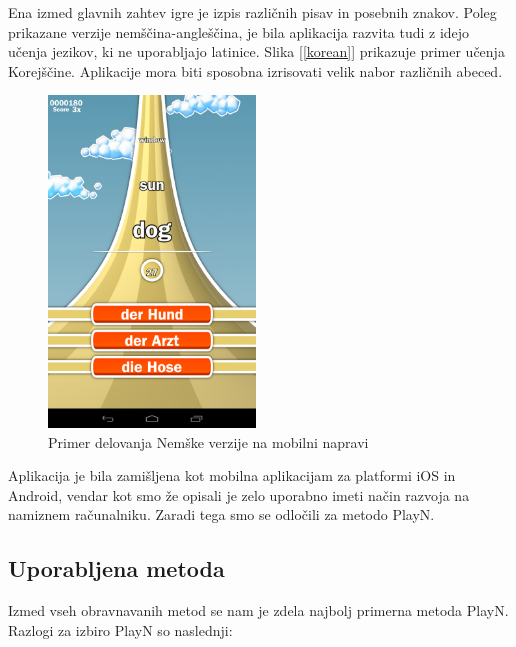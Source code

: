 Ena izmed glavnih zahtev igre je izpis različnih pisav in posebnih znakov. Poleg prikazane verzije nemščina-angleščina, je bila aplikacija razvita tudi z idejo učenja jezikov, ki ne uporabljajo latinice. Slika [\ref{korean}] prikazuje primer učenja Korejščine. Aplikacije mora biti sposobna izrisovati velik nabor različnih abeced.

\begin{figure}
\begin{center}
\includegraphics[width=5.5cm]{pic/defg-german.png}
\end{center}
\caption{Primer delovanja Nemške verzije na mobilni napravi}
\label{german}
\end{figure} 

Aplikacija je bila zamišljena kot mobilna aplikacijam za platformi iOS in Android, vendar kot smo že opisali je zelo uporabno imeti način razvoja na namiznem računalniku. Zaradi tega smo se odločili za metodo PlayN.

\subsection{Uporabljena metoda}

Izmed vseh obravnavanih metod se nam je zdela najbolj primerna metoda PlayN. Razlogi za izbiro PlayN so naslednji:

